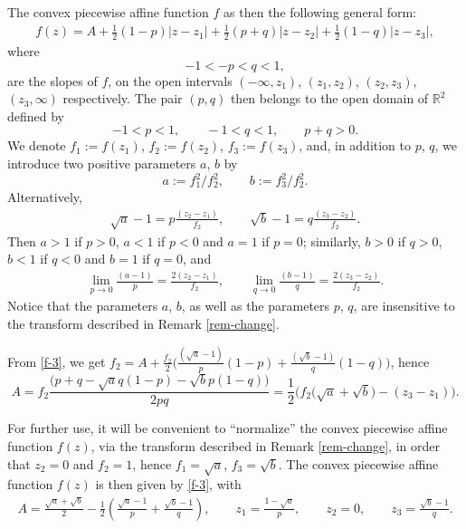 \documentclass[10pt,a4paper]{amsart}
\numberwithin{equation}{section}
\begin{document}
The convex piecewise affine function $f$ as then the following general form:
\begin{gather} \label{f-3} f (z) = A + \frac{1}{2} (1 - p) |z - z _1| + \frac{1}{2} (p + q) |z - z_2| + \frac{1}{2} (1 - q) |z - z _3|, \end{gather}
where
\[ - 1 < - p < q < 1, \]
are the slopes of $f$, on the open intervals $(- \infty, z_1)$, $(z _1, z_2)$, $(z_2, z_3)$, $(z _3, \infty)$ respectively. The pair $(p, q)$ then belongs to the open domain of $\mathbb{R} ^2$ defined by
\[ %
 - 1 < p < 1, \qquad - 1 < q < 1, \qquad p + q > 0.\]
We denote $f _1 := f (z _1)$, $f_2 := f(z_2) $, $f_3 := f (z_3)$, and, in addition to $p$, $q$, we introduce two positive parameters $a$, $b$ by
\[%
 a := f_1 ^2/f_2 ^2, \qquad b := f_3 ^2/f_2 ^2. \]
Alternatively,
\begin{gather} \label{ab-pq} \sqrt{a} - 1 = p \frac{(z_2 - z_1)}{f_2}, \qquad \sqrt{b} - 1 = q \frac{(z_3 - z_2)}{f_2}. \end{gather}
Then $a > 1$ if $p > 0$, $a <1$ if $p < 0$ and $a = 1$ if $p = 0$; similarly, $b > 0$ if $q > 0$, $b < 1$ if $q < 0$ and $b = 1$ if $q = 0$, and
\begin{gather} \label{lim} \lim _{p \to 0}{\frac{(a - 1)}{p}} = \frac{2 (z_2 - z_1)}{f_2}, \qquad \lim_{q \to 0}{\frac{(b - 1)}{q}} = \frac{2 (z_3 - z_2)}{f_2}. \end{gather}
Notice that the parameters $a$, $b$, as well as the parameters $p$, $q$, are insensitive to the transform described in Remark \ref{rem-change}.


From \eqref{f-3}, we get $f_2 = A + \frac{f_2}{2} \big(\frac{(\sqrt{a} - 1)}{p} (1 - p) + \frac{(\sqrt{b} - 1)}{q} (1 - q)\big)$, hence
\[%
A = f_2 \frac{\big(p + q - \sqrt{a} q (1 - p) - \sqrt{b} p (1 - q)\big)}{2 p q} =
\frac{1}{2} \big(f _2 \big(\sqrt{a} + \sqrt{b}\big) - (z _3 - z_1)\big). \]

\begin{rem} \label{rem-normalised} For further use, it will be convenient to ``normalize'' the convex piecewise affine function $f (z)$, via the transform described in Remark \ref{rem-change}, in order that $z _2 = 0$ and $f _2 = 1$, hence $f_1 = \sqrt{a}$, $f_3 = \sqrt{b}$. The convex piecewise affine function $f (z)$ is then given by \eqref{f-3}, with
\begin{gather*}
 A = \frac{\sqrt{a} + \sqrt{b}}{2} - \frac{1}{2} \left(\frac{\sqrt{a} - 1}{p} + \frac{\sqrt{b} - 1}{q}\right), \qquad z _1 = \frac{1 - \sqrt{a}}{p}, \qquad z _2 = 0, \qquad z _3 = \frac{\sqrt{b} - 1}{q}. \end{gather*}
\end{rem}
\end{document}
